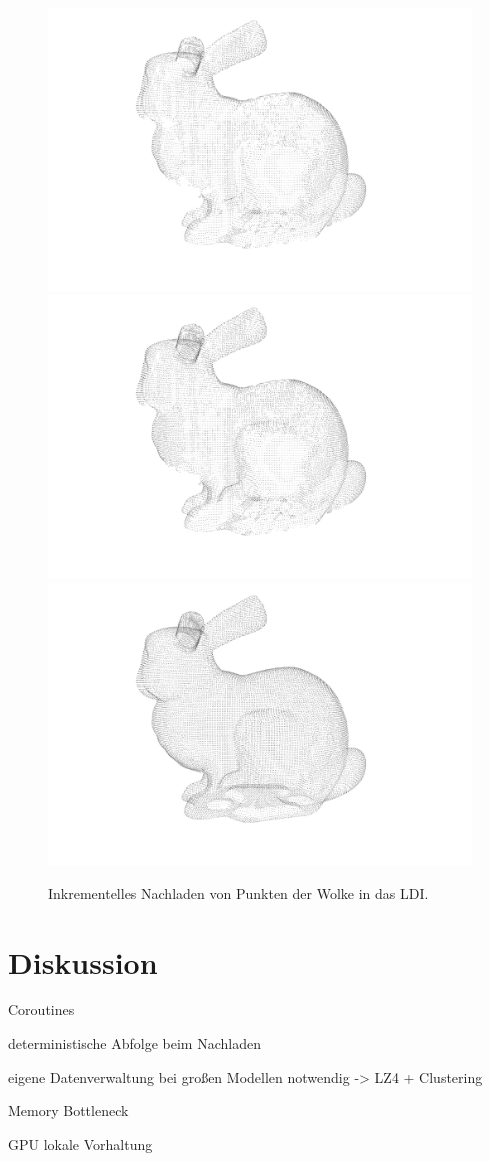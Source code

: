 \documentclass[hyperref, beleg, german]{cgvpub}
\begin{document}
\begin{figure}
	\includegraphics[width = .48\linewidth]{images/incrementalLoading/107}
	\includegraphics[width = .48\linewidth]{images/incrementalLoading/109}%
	\includegraphics[width = .48\linewidth]{images/incrementalLoading/115}
	\caption{Inkrementelles Nachladen von Punkten der Wolke in das LDI.}%
	\label{img:incload}
\end{figure}

\section{Diskussion}

Coroutines

deterministische Abfolge beim Nachladen

eigene Datenverwaltung bei großen Modellen notwendig -> LZ4 + Clustering

Memory Bottleneck

GPU lokale Vorhaltung
\end{document}
